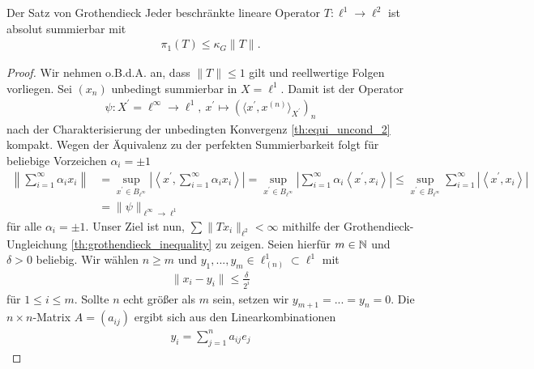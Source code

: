 \newpage
\begin{genericthm}{Der Satz von Grothendieck}
	Jeder beschränkte lineare Operator $ T : \ell^1 \to \ell^2 $ ist absolut summierbar mit
	\begin{align*}
		\pi_1(T) \leq \kappa_G \| T \|.
	\end{align*}
\end{genericthm}
\begin{proof}
	Wir nehmen o.B.d.A. an, dass $ \|T\| \leq 1 $ gilt und 
	reellwertige Folgen vorliegen.
	Sei $ (x_n) $ unbedingt summierbar in $ X = \ell^1 $.
	Damit ist der Operator
	\begin{align*}
		 \psi : X^\prime = \ell^\infty \to \ell^1, \ x^\prime \mapsto (\langle x^\prime , x^{(n)} \rangle_{X^\prime} )_n 
	\end{align*}
	nach der Charakterisierung der unbedingten Konvergenz \ref{th:equi_uncond_2} kompakt. Wegen der 
	Äquivalenz zu der perfekten Summierbarkeit folgt
	für beliebige Vorzeichen $ \alpha_i = \pm 1 $
	\begin{align*}
		\left\|
		\sum 
		\limits_{ i= 1}^\infty
		\alpha_i x_i
		\right\|
		&=
		\sup \limits_{ x^\prime  \in B_{\ell^\infty } }
		\left|
		\left\langle
		x^\prime, 
		\sum 
		\limits_{ i= 1}^\infty
		\alpha_i x_i
		\right\rangle 
		\right|
		=
		\sup \limits_{ x^\prime  \in B_{\ell^\infty } }
		\left|
		\sum 
		\limits_{ i= 1}^\infty
		\alpha_i
		\left\langle 
		x^\prime, 
		 x_i
		\right\rangle 
		\right|
		\leq
		\sup \limits_{ x^\prime  \in B_{\ell^\infty } }
		\sum 
		\limits_{ i= 1}^\infty
		\left|
		\left\langle 
		x^\prime, 
		x_i
		\right\rangle 
		\right|\\
		&= 
		\| \psi \|_{\ell^\infty \to \ell^1}
	\end{align*}
	für alle $ \alpha_i = \pm 1 $.
	Unser Ziel ist nun, $ \sum \|T x_i \|_{\ell^2} < \infty $ mithilfe der Grothendieck-Ungleichung \ref{th:grothendieck_inequality} zu zeigen.
	Seien hierfür $ m \in \mathbb{N} $ und $ \delta > 0 $ beliebig.
	Wir wählen $ n \geq m $ und $ y_1,...,y_m \in \ell_{(n)}^1 \subset \ell^1$ mit
	\begin{align*}
		\| x_i- y_i \| \leq \frac{\delta}{2^i}
	\end{align*}
	für $ 1 \leq i \leq m $. Sollte $ n  $ echt größer als $ m $ sein, setzen wir $ y_{m+1} = ... = y_n = 0 $.
	Die $ n \times n  $-Matrix $ A = (a_{ij}) $ ergibt sich aus
	den Linearkombinationen
	\begin{align*}
		y_i 
		=
		\sum \limits_{ j= 1}^n a_{ij} e_j
	\end{align*} 

\end{proof}
